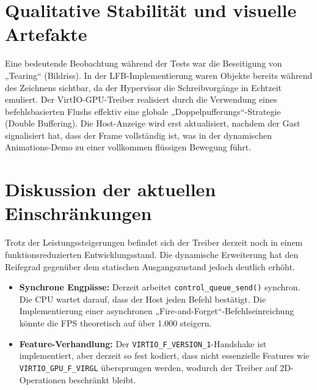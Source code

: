 \begin{center}
\end{center}

\section{Qualitative Stabilität und visuelle Artefakte}

Eine bedeutende Beobachtung während der Tests war die Beseitigung von
„Tearing“ (Bildriss). In der LFB-Implementierung waren Objekte bereits während
des Zeichnens sichtbar, da der Hypervisor die Schreibvorgänge in Echtzeit
emuliert. Der VirtIO-GPU-Treiber realisiert durch die Verwendung eines
befehlsbasierten Flushs effektiv eine globale „Doppelpufferungs“-Strategie
(Double Buffering). Die Host-Anzeige wird erst aktualisiert, nachdem der Gast
signalisiert hat, dass der Frame vollständig ist, was in der dynamischen
Animations-Demo zu einer vollkommen flüssigen Bewegung führt.

\section{Diskussion der aktuellen Einschränkungen}

Trotz der Leistungssteigerungen befindet sich der Treiber derzeit noch in einem
funktionsreduzierten Entwicklungsstand. Die dynamische Erweiterung hat den
Reifegrad gegenüber dem statischen Ausgangszustand jedoch deutlich erhöht.

\begin{itemize}
\item \textbf{Synchrone Engpässe:} Derzeit arbeitet \texttt{control\_queue\_send()} synchron. Die CPU wartet darauf, dass der Host jeden Befehl bestätigt. Die Implementierung einer asynchronen „Fire-and-Forget“-Befehlseinreichung könnte die FPS theoretisch auf über 1.000 steigern.
\item \textbf{Feature-Verhandlung:} Der \texttt{VIRTIO\_F\_VERSION\_1}-Handshake ist implementiert, aber derzeit so fest kodiert, dass nicht essenzielle Features wie \texttt{VIRTIO\_GPU\_F\_VIRGL} übersprungen werden, wodurch der Treiber auf 2D-Operationen beschränkt bleibt.
\end{itemize}

